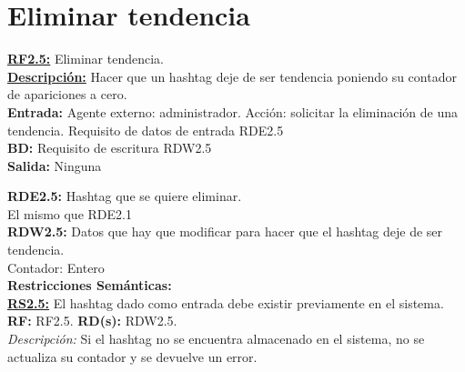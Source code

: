 \pagebreak

\section{Eliminar tendencia}
\textbf{\textcolor{rojo}{\underline{RF2.5:}}} Eliminar tendencia. \\[6pt]

\textbf{\textcolor{rojo}{\underline{Descripción:}}} Hacer que un hashtag deje de ser tendencia poniendo su contador de apariciones a cero.\\[6pt]

\textbf{\textcolor{rojo}{Entrada:}} Agente externo: administrador. Acción: solicitar la eliminación de una tendencia. 
Requisito de datos de entrada \textcolor{azul}{RDE2.5} \\[6pt]

\textbf{\textcolor{rojo}{BD:}} Requisito de escritura \textcolor{azul}{RDW2.5}\\[6pt]

\textbf{\textcolor{rojo}{Salida:}} Ninguna

\textcolor{azul}{\textbf{RDE2.5:}} Hashtag que se quiere eliminar. \\
\hspace*{1cm} El mismo que \textcolor{azul}{RDE2.1}\\

\textcolor{azul}{\textbf{RDW2.5:}} Datos que hay que modificar para hacer que el hashtag deje de ser tendencia. \\
\hspace*{1cm} Contador: Entero\\[12pt]

\textbf{\textcolor{verde}{Restricciones Semánticas:}} \\[6pt]
\textbf{\textcolor{verde}{\underline{RS2.5:}}} El hashtag dado como entrada debe existir previamente en el sistema. \textbf{RF:} RF2.5. \textbf{RD(s):} RDW2.5. \\
\hspace*{1cm} \textit{Descripción:} Si el hashtag no se encuentra almacenado en el sistema, no se actualiza su contador y se devuelve un error. \\[6pt]

\pagebreak

